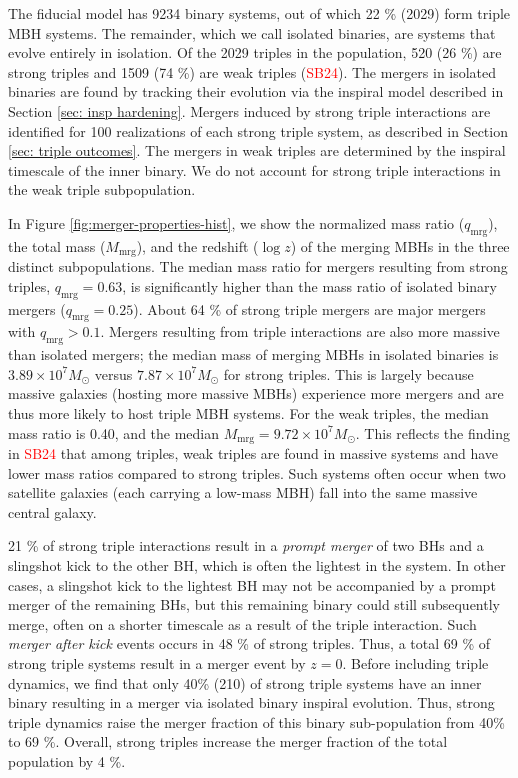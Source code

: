 \documentclass[twocolumn,linenumbers]{aastex701}
\newcommand{\SB}{\textcolor{red}{SB24}}
\begin{document}
The fiducial model has 9234 binary systems, out of which 22 \% (2029) form triple MBH systems. The remainder, which we call isolated binaries, are systems that evolve entirely in isolation. Of the 2029 triples in the population,
520 (26 \%) are strong triples and 1509 (74 \%) are weak triples (\SB{}). The mergers in isolated binaries are found by tracking their evolution via the inspiral model described in Section \ref{sec: insp hardening}. Mergers induced by strong triple interactions are identified for 100 realizations of each strong triple system, as described in Section \ref{sec: triple outcomes}. The mergers in weak triples are determined by the inspiral timescale of the inner binary. We do not account for strong triple interactions in the weak triple subpopulation.

In Figure \ref{fig:merger-properties-hist}, we show the normalized mass ratio ($q_{\text{mrg}}$), the total mass ($M_{\text{mrg}}$), and the redshift ($\log z$) of the merging MBHs in the three distinct subpopulations. The median mass ratio for mergers resulting from strong triples, $q_{\text{mrg}} = 0.63$, is significantly higher than the mass ratio of isolated binary mergers ($q_{\text{mrg}} = 0.25$). About 64 \% of strong triple mergers are major mergers with $q_{\text{mrg}} > 0.1$. Mergers resulting from triple interactions are also more massive than isolated mergers; the median mass of merging MBHs in isolated binaries is $3.89 \times 10^7 M_{\odot}$ versus $7.87 \times 10^7 M_{\odot}$ for strong triples.
This is largely because massive galaxies (hosting more massive MBHs) experience more mergers and are thus more likely to host triple MBH systems.
For the weak triples, the median mass ratio is 0.40, and the median  $M_{\text{mrg}} = 9.72 \times 10^7 M_{\odot}$. This reflects the finding in \SB{}  that among triples, weak triples are found in massive systems and have lower mass ratios compared to strong triples. Such systems often occur when two satellite galaxies (each carrying a low-mass MBH) fall into the same massive central galaxy.


21 \% of strong triple interactions result in a \emph{prompt merger} of two BHs and a slingshot kick to the other BH, which is often the lightest in the system.  In other cases, a slingshot kick to the lightest BH may not be accompanied by a prompt merger of the remaining BHs, but this remaining binary could still subsequently merge, often on a shorter timescale as a result of the triple interaction. Such \emph{merger after kick} events occurs in 48 \% of strong triples. Thus, a total 69 \% of strong triple systems result in a merger event by $z=0$. Before including triple dynamics, we find that only 40\% (210) of strong triple systems have an inner binary resulting in a merger via isolated binary inspiral evolution. Thus, strong triple dynamics raise the merger fraction of this binary sub-population from 40\% to 69 \%. Overall, strong triples increase the merger fraction of the total population by 4 \%.
\end{document}
